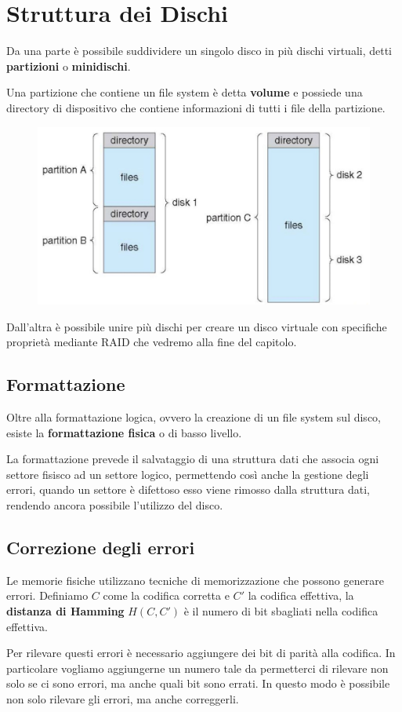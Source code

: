 \section{Struttura dei Dischi}
Da una parte è possibile suddividere un singolo disco in più dischi virtuali, detti \textbf{partizioni} o \textbf{minidischi}.

Una partizione che contiene un file system è detta \textbf{volume} e possiede una directory di dispositivo che contiene informazioni di tutti i file della partizione.

\begin{figure}[H]
    \centering
    \includegraphics[width=0.5\linewidth]{assets/partizioni.jpg}
\end{figure}

\spacer
Dall'altra è possibile unire più dischi per creare un disco virtuale con specifiche proprietà mediante RAID che vedremo alla fine del capitolo.

\subsection{Formattazione}
Oltre alla formattazione logica, ovvero la creazione di un file system sul disco, esiste la \textbf{formattazione fisica} o di basso livello.

La formattazione prevede il salvataggio di una struttura dati che associa ogni settore fisisco ad un settore logico, permettendo così anche la gestione degli errori, quando un settore è difettoso esso viene rimosso dalla struttura dati, rendendo ancora possibile l'utilizzo del disco.

\subsection{Correzione degli errori}
Le memorie fisiche utilizzano tecniche di memorizzazione che possono generare errori.
Definiamo $C$ come la codifica corretta e $C'$ la codifica effettiva, la \textbf{distanza di Hamming} $H(C, C')$ è il numero di bit sbagliati nella codifica effettiva.

\spacer
Per rilevare questi errori è necessario aggiungere dei bit di parità alla codifica. In particolare vogliamo aggiungerne un numero tale da permetterci di rilevare non solo se ci sono errori, ma anche quali bit sono errati. In questo modo è possibile non solo rilevare gli errori, ma anche correggerli.

